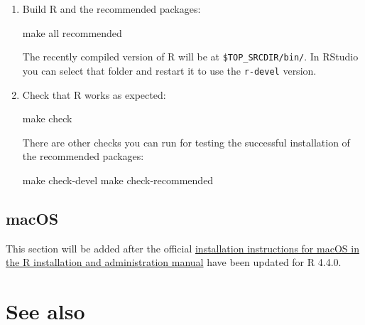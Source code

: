 \documentclass[
  letterpaper,
  DIV=11,
  numbers=noendperiod]{scrreprt}
\newenvironment{Shaded}{\begin{snugshade}}{\end{snugshade}}
\newcommand{\BuiltInTok}[1]{\textcolor[rgb]{0.00,0.23,0.31}{#1}}
\newcommand{\FunctionTok}[1]{\textcolor[rgb]{0.28,0.35,0.67}{#1}}
\newcommand{\NormalTok}[1]{\textcolor[rgb]{0.00,0.23,0.31}{#1}}
\newcommand{\StringTok}[1]{\textcolor[rgb]{0.13,0.47,0.30}{#1}}
\newcommand{\VariableTok}[1]{\textcolor[rgb]{0.07,0.07,0.07}{#1}}
\begin{document}
\begin{enumerate}
\begin{Shaded}
\end{Shaded}
\item
  Build R and the recommended packages:

\begin{Shaded}
\begin{Highlighting}[]
\FunctionTok{make}\NormalTok{ all recommended}
\end{Highlighting}
\end{Shaded}

  The recently compiled version of R will be at
  \texttt{\$TOP\_SRCDIR/bin/}. In RStudio you can select that folder and
  restart it to use the \texttt{r-devel} version.
\item
  Check that R works as expected:

\begin{Shaded}
\begin{Highlighting}[]
\FunctionTok{make}\NormalTok{ check}
\end{Highlighting}
\end{Shaded}

  There are other checks you can run for testing the successful
  installation of the recommended packages:

\begin{Shaded}
\begin{Highlighting}[]
\FunctionTok{make}\NormalTok{ check{-}devel}
\FunctionTok{make}\NormalTok{ check{-}recommended}
\end{Highlighting}
\end{Shaded}
\end{enumerate}

\subsection{macOS}\label{macos}

This section will be added after the official
\href{https://cran.r-project.org/doc/manuals/r-devel/R-admin.html\#macOS}{installation
instructions for macOS in the R installation and administration manual}
have been updated for R 4.4.0.

\section{See also}\label{see-also}
\end{document}
